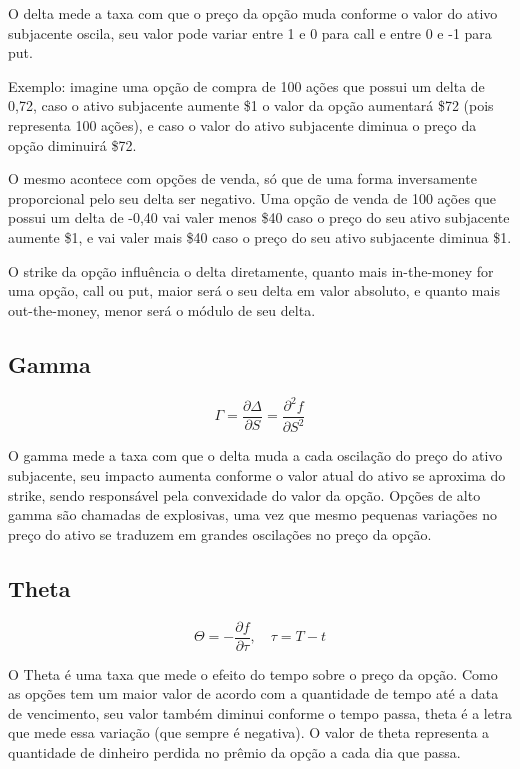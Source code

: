 \documentclass[]{book}
\begin{document}
O delta mede a taxa com que o preço da opção muda conforme o valor do
ativo subjacente oscila, seu valor pode variar entre 1 e 0 para call e
entre 0 e -1 para put.

Exemplo: imagine uma opção de compra de 100 ações que possui um delta de
0,72, caso o ativo subjacente aumente {\$}1 o valor da opção aumentará
{\$}72 (pois representa 100 ações), e caso o valor do ativo subjacente
diminua o preço da opção diminuirá {\$}72.

O mesmo acontece com opções de venda, só que de uma forma inversamente
proporcional pelo seu delta ser negativo. Uma opção de venda de 100
ações que possui um delta de -0,40 vai valer menos {\$}40 caso o preço
do seu ativo subjacente aumente {\$}1, e vai valer mais {\$}40 caso o
preço do seu ativo subjacente diminua {\$}1.

O strike da opção influência o delta diretamente, quanto mais
in-the-money for uma opção, call ou put, maior será o seu delta em valor
absoluto, e quanto mais out-the-money, menor será o módulo de seu delta.

\subsection{Gamma}\label{gamma}

\begin{equation}
\Gamma = \frac{\partial \Delta}{\partial S} = \frac{\partial^2 f}{\partial S^2}
\label{eq:gamma}
\end{equation}

O gamma mede a taxa com que o delta muda a cada oscilação do preço do
ativo subjacente, seu impacto aumenta conforme o valor atual do ativo se
aproxima do strike, sendo responsável pela convexidade do valor da
opção. Opções de alto gamma são chamadas de explosivas, uma vez que
mesmo pequenas variações no preço do ativo se traduzem em grandes
oscilações no preço da opção.

\subsection{Theta}\label{theta}

\begin{equation}
\Theta = -\frac{\partial f}{\partial \tau}, \quad \tau=T-t
\label{eq:theta}
\end{equation}

O Theta é uma taxa que mede o efeito do tempo sobre o preço da opção.
Como as opções tem um maior valor de acordo com a quantidade de tempo
até a data de vencimento, seu valor também diminui conforme o tempo
passa, theta é a letra que mede essa variação (que sempre é negativa). O
valor de theta representa a quantidade de dinheiro perdida no prêmio da
opção a cada dia que passa.
\end{document}
